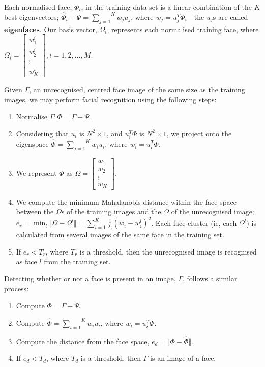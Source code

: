 Each normalised face, $\Phi_{i}$, in the training data set is a linear combination of the $K$ best eigenvectors; $\hat{\Phi}_{i} - \Psi = \overset{K}{\underset{j=1}{\sum}} w_{j} u_{j}$, where $w_{j} = u_{j}^{T} \Phi_{i}$---the $u_{j}$s are called \textbf{eigenfaces}. Our basis vector, $\Omega_{i}$, represents each normalised training face, where $\Omega_{i} = \begin{bmatrix}w_{1}^{i}\\w_{2}^{i}\\ \vdots\\ w_{K}^{i} \end{bmatrix}, i = 1, 2, \ldots, M$.

Given $\Gamma$, an unrecognised, centred face image of the same size as the training images, we may perform facial recognition using the following steps:
\begin{enumerate}
    \item Normalise $\Gamma: \Phi = \Gamma - \Psi$.
    \item Considering that $u_{i}$ is $N^{2} \times 1$, and $u_{i}^{T} \Phi$ is $N^{2} \times 1$, we project onto the eigenspace $\hat{\Phi} = \overset{K}{\underset{j=1}{\sum}} w_{i} u_{i}$, where $w_{i} = u_{i}^{T} \Phi$.
    \item We represent $\Phi$ as $\Omega = \begin{bmatrix}w_{1}\\w_{2}\\ \vdots\\ w_{K} \end{bmatrix}$.
    \item We compute the minimum Mahalanobis distance within the face space between the $\Omega$s of the training images and the $\Omega$ of the unrecognised image; $e_{r} = \min_{l} \Vert \Omega - \Omega^{l} \Vert = \sum_{i=1}^{K} \frac{1}{\lambda_{i}} (w_{i} - w_{i}^{l})^{2}$. Each face cluster (ie, each $\Omega^{l}$) is calculated from several images of the same face in the training set.
    \item If $e_{r} < T_{r}$, where $T_{r}$ is a threshold, then the unrecognised image is recognised as face $l$ from the training set.
\end{enumerate}

Detecting whether or not a face is present in an image, $\Gamma$, follows a similar process:
\begin{enumerate}
    \item Compute $\Phi = \Gamma - \Psi$.
    \item Compute $\hat{\Phi} = \overset{K}{\underset{i=1}{\sum}} w_{i} u_{i}$, where $w_{i} = u_{i}^{T} \Phi$.
    \item Compute the distance from the face space, $e_{d} = \Vert \Phi - \hat{\Phi} \Vert$.
    \item If $e_{d} < T_{d}$, where $T_{d}$ is a threshold, then $\Gamma$ is an image of a face.
\end{enumerate}


